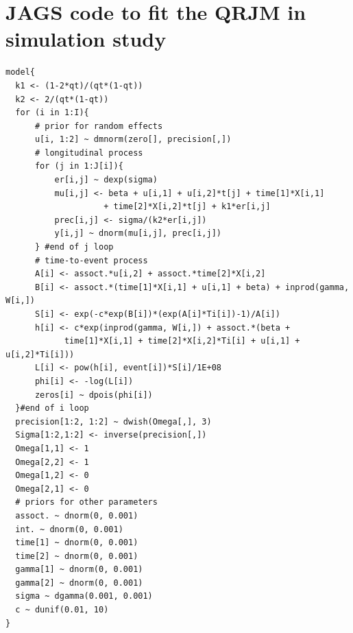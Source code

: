 \documentclass[12pt]{article}
\begin{document}
\section{\textsf{JAGS} code to fit the QRJM in simulation study}
{\scriptsize
\begin{verbatim}
model{
  k1 <- (1-2*qt)/(qt*(1-qt))
  k2 <- 2/(qt*(1-qt))
  for (i in 1:I){
      # prior for random effects
      u[i, 1:2] ~ dmnorm(zero[], precision[,])
      # longitudinal process
      for (j in 1:J[i]){
          er[i,j] ~ dexp(sigma)
          mu[i,j] <- beta + u[i,1] + u[i,2]*t[j] + time[1]*X[i,1]
                    + time[2]*X[i,2]*t[j] + k1*er[i,j]
          prec[i,j] <- sigma/(k2*er[i,j])
          y[i,j] ~ dnorm(mu[i,j], prec[i,j])
      } #end of j loop
      # time-to-event process
      A[i] <- assoct.*u[i,2] + assoct.*time[2]*X[i,2]
      B[i] <- assoct.*(time[1]*X[i,1] + u[i,1] + beta) + inprod(gamma, W[i,])
      S[i] <- exp(-c*exp(B[i])*(exp(A[i]*Ti[i])-1)/A[i])
      h[i] <- c*exp(inprod(gamma, W[i,]) + assoct.*(beta +
            time[1]*X[i,1] + time[2]*X[i,2]*Ti[i] + u[i,1] + u[i,2]*Ti[i]))
      L[i] <- pow(h[i], event[i])*S[i]/1E+08
      phi[i] <- -log(L[i])
      zeros[i] ~ dpois(phi[i])
  }#end of i loop
  precision[1:2, 1:2] ~ dwish(Omega[,], 3)
  Sigma[1:2,1:2] <- inverse(precision[,])
  Omega[1,1] <- 1
  Omega[2,2] <- 1
  Omega[1,2] <- 0
  Omega[2,1] <- 0
  # priors for other parameters
  assoct. ~ dnorm(0, 0.001)
  int. ~ dnorm(0, 0.001)
  time[1] ~ dnorm(0, 0.001)
  time[2] ~ dnorm(0, 0.001)
  gamma[1] ~ dnorm(0, 0.001)
  gamma[2] ~ dnorm(0, 0.001)
  sigma ~ dgamma(0.001, 0.001)
  c ~ dunif(0.01, 10)
}
\end{verbatim}
}
\end{document}
